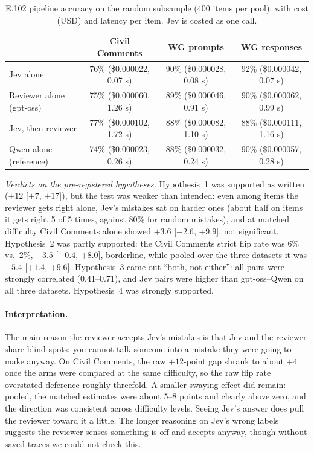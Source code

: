 \documentclass[11pt]{article}
\renewcommand{\_}{\origunderscore\allowbreak}
\begin{document}
\begin{table}[H]
\centering
\small
\caption{E.102 pipeline accuracy on the random subsample (400 items per pool), with cost (USD) and latency per item. Jev is costed as one call.}
\label{tab:e102-pipe}
\begin{tabularx}{\textwidth}{Xccc}
\toprule
 & Civil Comments & WG prompts & WG responses \\
\midrule
Jev alone & 76\% (\$0.000022, 0.07 s) & 90\% (\$0.000028, 0.08 s) & 92\% (\$0.000042, 0.07 s) \\
Reviewer alone (gpt-oss) & 75\% (\$0.000060, 1.26 s) & 89\% (\$0.000046, 0.91 s) & 90\% (\$0.000062, 0.99 s) \\
Jev, then reviewer & 77\% (\$0.000102, 1.72 s) & 88\% (\$0.000082, 1.10 s) & 88\% (\$0.000111, 1.16 s) \\
Qwen alone (reference) & 74\% (\$0.000023, 0.26 s) & 88\% (\$0.000032, 0.24 s) & 90\% (\$0.000057, 0.28 s) \\
\bottomrule
\end{tabularx}
\end{table}

\emph{Verdicts on the pre-registered hypotheses.} Hypothesis~1 was supported as written ($+12$ [$+7$, $+17$]), but the test was weaker than intended: even among items the reviewer gets right alone, Jev's mistakes sat on harder ones (about half on items it gets right 5 of 5 times, against 80\% for random mistakes), and at matched difficulty Civil Comments alone showed $+3.6$ [$-2.6$, $+9.9$], not significant. Hypothesis~2 was partly supported: the Civil Comments strict flip rate was 6\% vs.\ 2\%, $+3.5$ [$-0.4$, $+8.0$], borderline, while pooled over the three datasets it was $+5.4$ [$+1.4$, $+9.6$]. Hypothesis~3 came out ``both, not either'': all pairs were strongly correlated (0.41--0.71), and Jev pairs were higher than gpt-oss--Qwen on all three datasets. Hypothesis~4 was strongly supported.

\paragraph{Interpretation.}
The main reason the reviewer accepts Jev's mistakes is that Jev and the reviewer share blind spots: you cannot talk someone into a mistake they were going to make anyway. On Civil Comments, the raw $+12$-point gap shrank to about $+4$ once the arms were compared at the same difficulty, so the raw flip rate overstated deference roughly threefold. A smaller swaying effect did remain: pooled, the matched estimates were about 5--8 points and clearly above zero, and the direction was consistent across difficulty levels. Seeing Jev's answer does pull the reviewer toward it a little. The longer reasoning on Jev's wrong labels suggests the reviewer senses something is off and accepts anyway, though without saved traces we could not check this.
\end{document}
